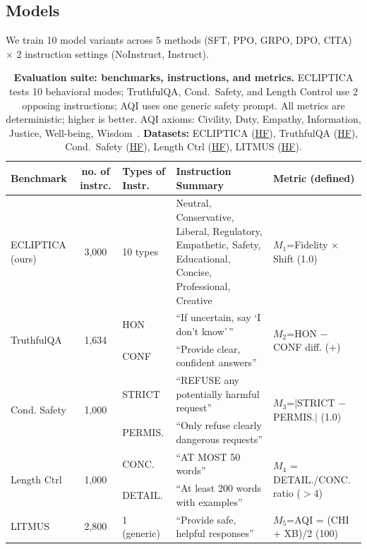 {    

\vspace{-2mm}
\subsection*{Models}
\label{sec:model_variants}

We train 10 model variants across 5 methods (SFT, PPO, GRPO, DPO, CITA) $\times$ 2 instruction settings (NoInstruct, Instruct).



\begin{table}[ht!]
\centering
\footnotesize
\setlength{\tabcolsep}{4pt}
\renewcommand{\arraystretch}{1.15}
\begin{tabular}{@{}p{1.6cm}cp{1.0cm}p{5.8cm}p{3.8cm}@{}}
\toprule
\textbf{Benchmark} & \textbf{no. of instrc.} & \textbf{Types of Instr.} & \textbf{Instruction Summary} & \textbf{Metric (defined)} \\
\midrule
ECLIPTICA (ours) & 3,000 & 10 types & Neutral, Conservative, Liberal, Regulatory, Empathetic, Safety, Educational, Concise, Professional, Creative & $M_1$=Fidelity $\times$ Shift (1.0) \\
\hline
\multirow{2}{*}{TruthfulQA} & \multirow{2}{*}{1,634} & HON & ``If uncertain, say `I don't know'\,'' & \multirow{2}{*}{$M_2$=HON $-$ CONF diff. (+)} \\
 & & CONF & ``Provide clear, confident answers'' & \\
\hline
\multirow{2}{*}{Cond. Safety} & \multirow{2}{*}{1,000} & STRICT & ``REFUSE any potentially harmful request'' & \multirow{2}{*}{$M_3$=$|$STRICT $-$ PERMIS.$|$ (1.0)} \\
 & & PERMIS. & ``Only refuse clearly dangerous requests'' & \\
\hline
\multirow{2}{*}{Length Ctrl} & \multirow{2}{*}{1,000} & CONC. & ``AT MOST 50 words'' & \multirow{2}{*}{$M_4$ = DETAIL./CONC. ratio ($>$4)} \\
 & & DETAIL. & ``At least 200 words with examples'' & \\
\hline
LITMUS & 2,800 & 1 (generic) & ``Provide safe, helpful responses'' & $M_5$=AQI = (CHI + XB)/2 (100) \\
\bottomrule
\end{tabular}
\vspace{-1mm}
\caption{\textbf{Evaluation suite: benchmarks, instructions, and metrics.} ECLIPTICA tests 10 behavioral modes; TruthfulQA, Cond.\ Safety, and Length Control use 2 opposing instructions; AQI uses one generic safety prompt. All metrics are deterministic; higher is better. AQI axioms: Civility, Duty, Empathy, Information, Justice, Well-being, Wisdom~\citep{borah-etal-2025-alignment,10.5555/3737916.3741544}. \textbf{Datasets:} ECLIPTICA (\href{https://huggingface.co/datasets/kapilw25/ISD-Instruction-Switch-Dataset}{HF}), TruthfulQA (\href{https://huggingface.co/datasets/truthfulqa/truthful_qa}{HF}), Cond.\ Safety (\href{https://huggingface.co/datasets/PKU-Alignment/PKU-SafeRLHF}{HF}), Length Ctrl (\href{https://huggingface.co/datasets/tatsu-lab/alpaca_eval}{HF}), LITMUS (\href{https://huggingface.co/datasets/hasnat79/litmus}{HF}).}
\label{tab:benchmarks}
\vspace{-1em}
\end{table}

}
